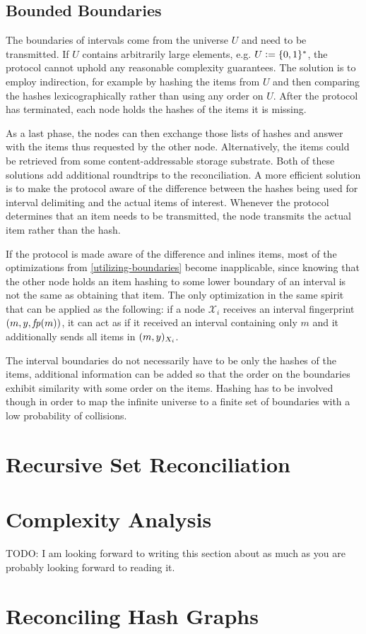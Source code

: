 \subsection{Bounded Boundaries}

The boundaries of intervals come from the universe $U$ and need to be transmitted. If $U$ contains arbitrarily large elements, e.g. $U \vcentcolon= \{0, 1\}^{\ast}$, the protocol cannot uphold any reasonable complexity guarantees. The solution is to employ indirection, for example by hashing the items from $U$ and then comparing the hashes lexicographically rather than using any order on $U$. After the protocol has terminated, each node holds the hashes of the items it is missing.

As a last phase, the nodes can then exchange those lists of hashes and answer with the items thus requested by the other node. Alternatively, the items could be retrieved from some content-addressable storage substrate. Both of these solutions add additional roundtrips to the reconciliation. A more efficient solution is to make the protocol aware of the difference between the hashes being used for interval delimiting and the actual items of interest. Whenever the protocol determines that an item needs to be transmitted, the node transmits the actual item rather than the hash.

If the protocol is made aware of the difference and inlines items, most of the optimizations from \cref{utilizing-boundaries} become inapplicable, since knowing that the other node holds an item hashing to some lower boundary of an interval is not the same as obtaining that item. The only optimization in the same spirit that can be applied as the following: if a node $\mathcal{X}_i$ receives an interval fingerprint $({m}, {y}, {\mathit{fp}(m)})$, it can act as if it received an interval containing only $m$ and it additionally sends all items in $({m},{y})_{X_i}$.

The interval boundaries do not necessarily have to be only the hashes of the items, additional information can be added so that the order on the boundaries exhibit similarity with some order on the items. Hashing has to be involved though in order to map the infinite universe to a finite set of boundaries with a low probability of collisions.

\section{Recursive Set Reconciliation}
\label{set-reconciliation-def}

\section{Complexity Analysis}
\label{set-reconciliation-complexity}

TODO: I am looking forward to writing this section about as much as you are probably looking forward to reading it. 

\section{Reconciling Hash Graphs}
\label{set-reconciliation-simple-graphs}
